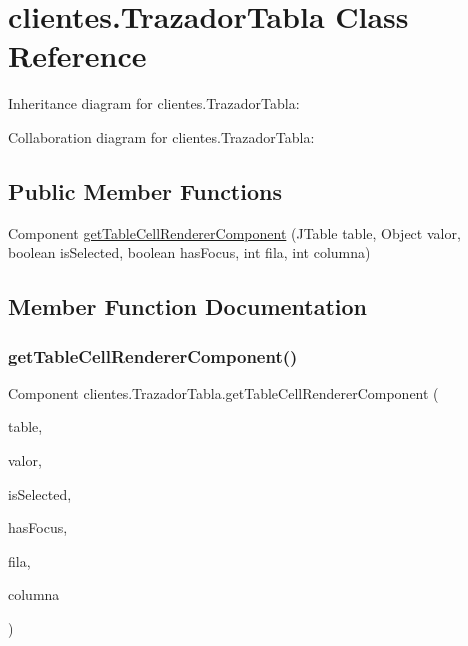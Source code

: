 \hypertarget{classclientes_1_1_trazador_tabla}{}\section{clientes.\+Trazador\+Tabla Class Reference}
\label{classclientes_1_1_trazador_tabla}


Inheritance diagram for clientes.\+Trazador\+Tabla\+:


Collaboration diagram for clientes.\+Trazador\+Tabla\+:
\subsection*{Public Member Functions}
\begin{DoxyCompactItemize}
\item 
Component \mbox{\hyperlink{classclientes_1_1_trazador_tabla_ac6f2957d9ca9c22ad4a58a9dfe224424}{get\+Table\+Cell\+Renderer\+Component}} (J\+Table table, Object valor, boolean is\+Selected, boolean has\+Focus, int fila, int columna)
\end{DoxyCompactItemize}


\subsection{Member Function Documentation}
\mbox{\label{classclientes_1_1_trazador_tabla_ac6f2957d9ca9c22ad4a58a9dfe224424}} 
\subsubsection{\texorpdfstring{get\+Table\+Cell\+Renderer\+Component()}{getTableCellRendererComponent()}}
{\footnotesize\ttfamily Component clientes.\+Trazador\+Tabla.\+get\+Table\+Cell\+Renderer\+Component (\begin{DoxyParamCaption}\item[{J\+Table}]{table,  }\item[{Object}]{valor,  }\item[{boolean}]{is\+Selected,  }\item[{boolean}]{has\+Focus,  }\item[{int}]{fila,  }\item[{int}]{columna }\end{DoxyParamCaption})\hspace{0.3cm}{\ttfamily [inline]}}

